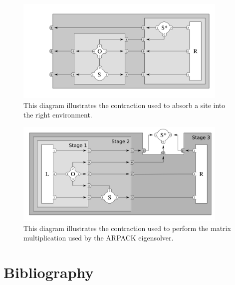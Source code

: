 \documentclass{article}
\newcommand{\diagramwidth}{4in}
\begin{document}
\begin{appendices}
\begin{figure}\begin{center}
\includegraphics[width=\diagramwidth]{drawings/contract_sos_right-opt}
\caption{\label{fig:contract_sos_right-opt} This diagram illustrates the contraction used to absorb a site into the right environment.}
\end{center}\end{figure}

\begin{figure}\begin{center}
\includegraphics[width=\diagramwidth]{drawings/iteration-opt}
\caption{\label{fig:iteration-opt} This diagram illustrates the contraction used to perform the matrix multiplication used by the ARPACK eigensolver.}
\end{center}\end{figure}

\clearpage

\end{appendices}

\part{Bibliography}



\end{document}
